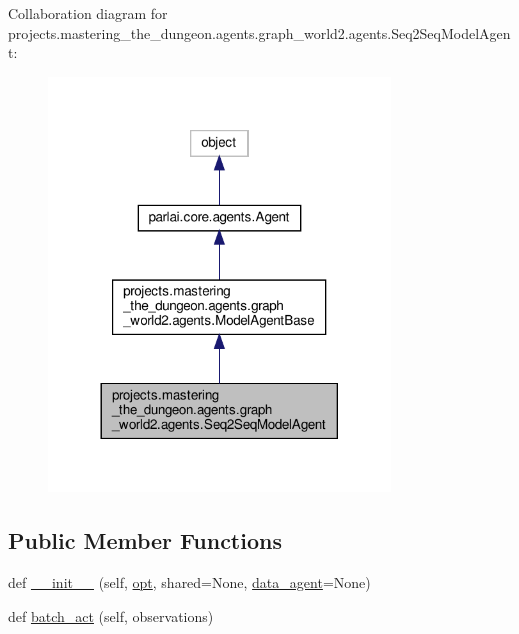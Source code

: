 Collaboration diagram for projects.\+mastering\+\_\+the\+\_\+dungeon.\+agents.\+graph\+\_\+world2.\+agents.\+Seq2\+Seq\+Model\+Agent\+:\nopagebreak
\begin{figure}[H]
\begin{center}
\leavevmode
\includegraphics[width=257pt]{d1/da0/classprojects_1_1mastering__the__dungeon_1_1agents_1_1graph__world2_1_1agents_1_1Seq2SeqModelAgent__coll__graph}
\end{center}
\end{figure}
\subsection*{Public Member Functions}
\begin{DoxyCompactItemize}
\item 
def \hyperlink{classprojects_1_1mastering__the__dungeon_1_1agents_1_1graph__world2_1_1agents_1_1Seq2SeqModelAgent_a355995e11c4f10e710dab06afa743373}{\+\_\+\+\_\+init\+\_\+\+\_\+} (self, \hyperlink{classparlai_1_1core_1_1agents_1_1Agent_ab3b45d2754244608c75d4068b90cd051}{opt}, shared=None, \hyperlink{classprojects_1_1mastering__the__dungeon_1_1agents_1_1graph__world2_1_1agents_1_1ModelAgentBase_a229b7901e20dced7e3b3c3e2d381d2ce}{data\+\_\+agent}=None)
\item 
def \hyperlink{classprojects_1_1mastering__the__dungeon_1_1agents_1_1graph__world2_1_1agents_1_1Seq2SeqModelAgent_a4a6f60aa35a0fcf6e033cf2fef28342b}{batch\+\_\+act} (self, observations)
\end{DoxyCompactItemize}
